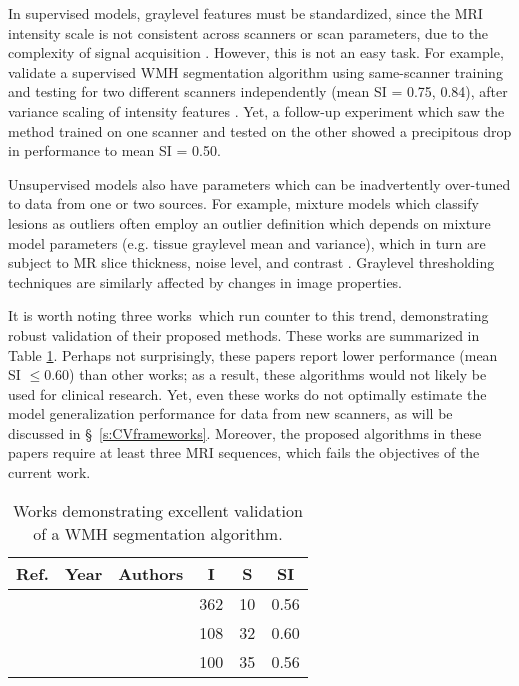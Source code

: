 \par
In supervised models, graylevel features must be standardized, since the MRI intensity scale is not consistent across scanners or scan parameters, due to the complexity of signal acquisition \cite{Nyul1999}. However, this is not an easy task. For example, \citeauthor{Steenwijk2013} validate a supervised WMH segmentation algorithm using same-scanner training and testing for two different scanners independently (mean SI = 0.75, 0.84), after variance scaling of intensity features \cite{Steenwijk2013}. Yet, a follow-up experiment which saw the method trained on one scanner and tested on the other showed a precipitous drop in performance to mean SI = 0.50. 
\par
Unsupervised models also have parameters which can be inadvertently over-tuned to data from one or two sources. For example, mixture models which classify lesions as outliers often employ an outlier definition which depends on mixture model parameters (e.g. tissue graylevel mean and variance), which in turn are subject to MR slice thickness, noise level, and contrast \cite{VanLeemput2001,Souplet2008,Garcia-Lorenzo2011,Roura2015}. Graylevel thresholding techniques \cite{Jack2001,Smart2011,Samaille2012,Schmidt2012,Khademi2014} are similarly affected by changes in image properties.
\par
It is worth noting three works\footnotemark\ which run counter to this trend, demonstrating robust validation of their proposed methods. These works are summarized in Table \ref{tab:priorworkval}. Perhaps not surprisingly, these papers report lower performance (mean SI $\le 0.60$) than other works; as a result, these algorithms would not likely be used for clinical research. Yet, even these works do not optimally estimate the model generalization performance for data from new scanners, as will be discussed in \S\ \ref{s:CVframeworks}. Moreover, the proposed algorithms in these papers require at least three MRI sequences, which fails the objectives of the current work.
\begin{table}[h]
  \newcommand{\citefortablev}[1]{{\cite{#1}}&{\citeyear{#1}}&{\citeauthor{#1}}}
  \caption{Works demonstrating excellent validation of a WMH segmentation algorithm.}\label{tab:priorworkval}
  \centering
    \begin{tabular}{cclccc}
      \hline
      Ref.&Year&Authors&I&S&SI
      \\\hline
      \citefortablev{Dyrby2008} & 362 & 10 & 0.56 \\
      \citefortablev{Guizard2015} & 108 & 32 & 0.60 \\
      \citefortablev{Harmouche2015} & 100 & 35 & 0.56 \\
      \hline
    \end{tabular}
\end{table}
